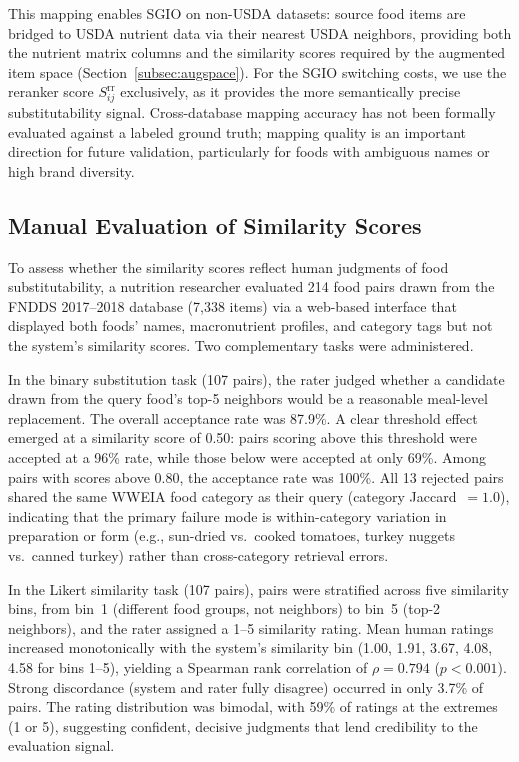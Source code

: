 \documentclass[journal]{IEEEtran}
\begin{document}
This mapping enables SGIO on non-USDA datasets: source food items are
bridged to USDA nutrient data via their nearest USDA neighbors,
providing both the nutrient matrix columns and the similarity scores
required by the augmented item space (Section~\ref{subsec:augspace}).
For the SGIO switching costs, we use the reranker score
$S_{ij}^{\mathrm{rr}}$ exclusively, as it provides the more
semantically precise substitutability signal. Cross-database mapping
accuracy has not been formally evaluated against a labeled ground truth;
mapping quality is an important direction for future validation,
particularly for foods with ambiguous names or high brand diversity.

\subsection{Manual Evaluation of Similarity Scores}
\label{subsec:sim_eval}

To assess whether the similarity scores reflect human judgments of food
substitutability, a nutrition researcher evaluated 214 food pairs drawn
from the FNDDS 2017--2018 database (7,338 items) via a web-based
interface that displayed both foods' names, macronutrient profiles, and
category tags but not the system's similarity scores. Two complementary
tasks were administered.

In the binary substitution task (107 pairs), the rater judged whether a
candidate drawn from the query food's top-5 neighbors would be a
reasonable meal-level replacement. The overall acceptance rate was
87.9\%. A clear threshold effect emerged at a similarity score of 0.50:
pairs scoring above this threshold were accepted at a 96\% rate, while
those below were accepted at only 69\%. Among pairs with scores above
0.80, the acceptance rate was 100\%. All 13 rejected pairs shared the
same WWEIA food category as their query (category Jaccard~$= 1.0$),
indicating that the primary failure mode is within-category variation in
preparation or form (e.g., sun-dried vs.\ cooked tomatoes, turkey
nuggets vs.\ canned turkey) rather than cross-category retrieval errors.

In the Likert similarity task (107 pairs), pairs were stratified across
five similarity bins, from bin~1 (different food groups, not neighbors)
to bin~5 (top-2 neighbors), and the rater assigned a 1--5 similarity
rating. Mean human ratings increased monotonically with the system's
similarity bin (1.00, 1.91, 3.67, 4.08, 4.58 for bins 1--5), yielding
a Spearman rank correlation of $\rho = 0.794$ ($p < 0.001$). Strong
discordance (system and rater fully disagree) occurred in only 3.7\% of
pairs. The rating distribution was bimodal, with 59\% of ratings at the
extremes (1 or 5), suggesting confident, decisive judgments that lend
credibility to the evaluation signal.
\end{document}
